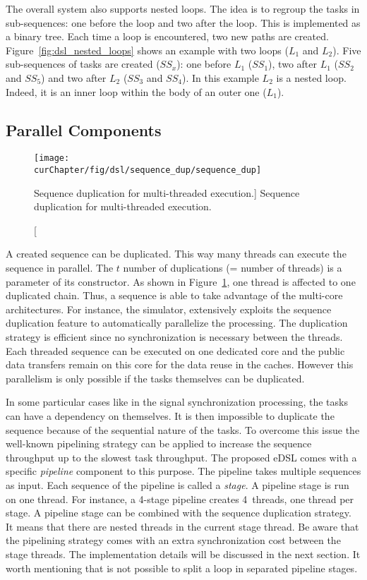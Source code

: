 The overall system also supports nested loops. The idea is to regroup the tasks
in sub-sequences: one before the loop and two after the loop. This is
implemented as a binary tree. Each time a loop is encountered, two new paths are
created. Figure~\ref{fig:dsl_nested_loops} shows an example with two loops
($L_1$ and $L_2$). Five sub-sequences of tasks are created ($SS_x$): one before
$L_1$ ($SS_1$), two after $L_1$ ($SS_2$ and $SS_5$) and two after $L_2$ ($SS_3$
and $SS_4$). In this example $L_2$ is a nested loop. Indeed, it is an inner loop
within the body of an outer one ($L_1$).

\subsection{Parallel Components}

\begin{figure}[htp]
  \centering
  \texttt{[image: \\curChapter/fig/dsl/sequence\_dup/sequence\_dup]}
  \caption
    [Sequence duplication for multi-threaded execution.]
    {Sequence duplication for multi-threaded execution.}
  \label{fig:dsl_sequence_dup}
\end{figure}

A created sequence can be duplicated. This way many threads can execute the
sequence in parallel. The $t$ number of duplications (= number of threads) is a
parameter of its constructor. As shown in Figure~\ref{fig:dsl_sequence_dup}, one
thread is affected to one duplicated chain. Thus, a sequence is able to take
advantage of the multi-core architectures. For instance, the \AFFECT simulator,
extensively exploits the sequence duplication feature to automatically
parallelize the processing. The duplication strategy is efficient since no
synchronization is necessary between the threads. Each threaded sequence can
be executed on one dedicated core and the public data transfers remain on this
core for the data reuse in the caches. However this parallelism is only possible
if the tasks themselves can be duplicated.

In some particular cases like in the signal synchronization processing, the
tasks can have a dependency on themselves. It is then impossible to duplicate
the sequence because of the sequential nature of the tasks. To overcome this
issue the well-known pipelining strategy can be applied to increase the sequence
throughput up to the slowest task throughput. The proposed eDSL comes with a
specific \emph{pipeline} component to this purpose. The pipeline takes multiple
sequences as input. Each sequence of the pipeline is called a \emph{stage}. A
pipeline stage is run on one thread. For instance, a 4-stage pipeline creates
4~threads, one thread per stage. A pipeline stage can be combined with the
sequence duplication strategy. It means that there are nested threads in the
current stage thread. Be aware that the pipelining strategy comes with an extra
synchronization cost between the stage threads. The implementation details will
be discussed in the next section. It worth mentioning that is not possible to
split a loop in separated pipeline stages.

